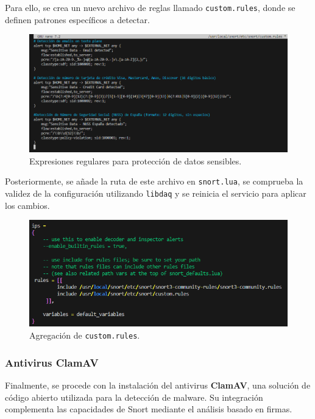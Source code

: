\documentclass[11pt,a4paper,twoside]{report}
\begin{document}
Para ello, se crea un nuevo archivo de reglas llamado \texttt{custom.rules}, donde se definen patrones específicos a detectar.

\begin{figure}[H]
	\centering
	\includegraphics[scale=0.6]{sensitive/1.png}
	\caption{Expresiones regulares para protección de datos sensibles.}
\end{figure}

Posteriormente, se añade la ruta de este archivo en \texttt{snort.lua}, se comprueba la validez de la configuración utilizando \texttt{libdaq} y se reinicia el servicio para aplicar los cambios.

\begin{figure}[H]
	\centering
	\includegraphics[scale=0.6]{sensitive/2.png}
	\caption{Agregación de \texttt{custom.rules}.}
\end{figure}

\pagebreak

\subsubsection*{Antivirus ClamAV}

Finalmente, se procede con la instalación del antivirus \textbf{ClamAV}, una solución de código abierto utilizada para la detección de malware. Su integración complementa las capacidades de Snort mediante el análisis basado en firmas.
\end{document}
